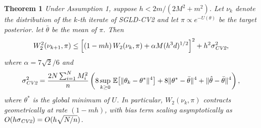 \textbf{Theorem 1} \textit{Under Assumption 1, suppose $h < 2m/(2M^2 + m^2)$. Let $\nu_k$ denote the distribution of the $k$-th iterate of SGLD-CV2 and let $\pi \propto e^{-U(\theta)}$ be the target posterior. let $\bar\theta$ be the mean of $\pi$. Then
\begin{equation}
    W_2^2(\nu_{k+1}, \pi) \leq \Big[(1-mh)\,W_2(\nu_k,\pi) + \alpha M(h^3 d)^{1/2}\Big]^2 + h^2\sigma^2_{\emph{CV2}},
\end{equation}
where $\alpha = 7\sqrt{2}/6$ and
\begin{equation}
    \sigma^2_{\emph{CV2}} = \frac{2N\sum_{i=1}^N M_i^2}{n}\left(8\sup_{k\geq 0}\,\mathbb{E}\big[\|\theta_k - \theta^*\|^4\big] + 8\|\theta^* - \bar\theta\|^4 + \|\hat\theta - \bar\theta\|^4\right),
\end{equation}
where $\theta^*$ is the global minimum of $U$. In particular, $W_2(\nu_k, \pi)$ contracts geometrically at rate $(1-mh)$, with bias term scaling asymptotically as $O(h\sigma_{\emph{CV2}}) = O(h\sqrt{N/n})$.}

